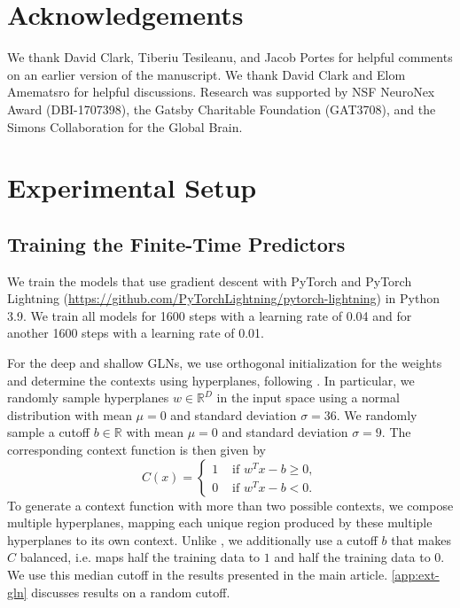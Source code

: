 \documentclass{article}
\theoremstyle{plain}
\theoremstyle{definition}
\theoremstyle{remark}
\begin{document}
\section*{Acknowledgements}

We thank David Clark, Tiberiu Tesileanu, and Jacob Portes for helpful comments on an earlier version of the manuscript. We thank David Clark and Elom Amematsro for helpful discussions. Research was supported by NSF NeuroNex Award (DBI-1707398), the Gatsby Charitable Foundation (GAT3708), and the Simons Collaboration for the Global Brain.




\newpage
\appendix

\section{Experimental Setup}
\label{app:experimental-setup}

\subsection{Training the Finite-Time Predictors}

We train the models that use gradient descent with PyTorch \citep{paszke_pytorch_2019} and PyTorch Lightning (\url{https://github.com/PyTorchLightning/pytorch-lightning}) in Python 3.9.
We train all models for 1600 steps with a learning rate of 0.04 and for another 1600 steps with a learning rate of 0.01.

For the deep and shallow GLNs, we use orthogonal initialization \citep{saxe_exact_2014} for the weights and determine the contexts using hyperplanes, following \citet{veness_online_2017}.
In particular, we randomly sample hyperplanes $w\in\mathbb{R}^D$ in the input space using a normal distribution with mean $\mu=0$ and standard deviation $\sigma=36$.
We randomly sample a cutoff $b\in\mathbb{R}$ with mean $\mu=0$ and standard deviation $\sigma=9$.
The corresponding context function is then given by
$$
C(x)=
\begin{cases}
1&\text{ if }w^Tx-b\geq 0,\\
0&\text{ if }w^Tx-b<0.
\end{cases}
$$
To generate a context function with more than two possible contexts, we compose multiple hyperplanes, mapping each unique region produced by these multiple hyperplanes to its own context.
Unlike \citet{veness_online_2017}, we additionally use a cutoff $b$ that makes $C$ balanced, i.e. maps half the training data to $1$ and half the training data to $0$.
We use this median cutoff in the results presented in the main article.
\cref{app:ext-gln} discusses results on a random cutoff.
\end{document}

